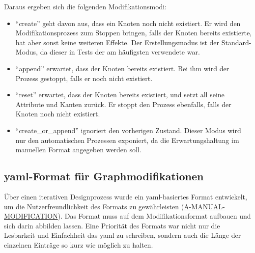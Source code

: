 Daraus ergeben sich die folgenden Modifikationsmodi:

\begin{itemize}
    \itemsep0em
    \item \enquote{create} geht davon aus, dass ein Knoten noch nicht existiert.
    Er wird den Modifikationsprozess zum Stoppen bringen, falls der Knoten bereits existierte, hat aber sonst keine weiteren Effekte.
    Der Erstellungsmodus ist der Standard-Modus, da dieser in Tests der am häufigsten verwendete war.
    \item \enquote{append} erwartet, dass der Knoten bereits existiert.
    Bei ihm wird der Prozess gestoppt, falls er noch nicht existiert.
    \item \enquote{reset} erwartet, dass der Knoten bereits existiert, und setzt all seine Attribute und Kanten zurück.
    Er stoppt den Prozess ebenfalls, falls der Knoten noch nicht existiert.
    \item \enquote{create\_or\_append} ignoriert den vorherigen Zustand.
    Dieser Modus wird nur den automatischen Prozessen exponiert, da die Erwartungshaltung im manuellen Format angegeben werden soll.
\end{itemize}

\subsection{\acrshort{yaml}-Format für Graphmodifikationen}\label{subsec:modell-graph-modification-yaml}

Über einen iterativen Designprozess wurde ein \acrshort{yaml}-basiertes Format entwickelt, um die Nutzerfreundlichkeit des Formats zu gewährleisten (\hyperref[subsec:req-manual-format-modification]{A-MANUAL-MODIFICATION}).
Das Format muss auf dem Modifikationsformat aufbauen und sich darin abbilden lassen.
Eine Priorität des Formats war nicht nur die Lesbarkeit und Einfachheit das \acrshort{yaml} zu schreiben, sondern auch die Länge der einzelnen Einträge so kurz wie möglich zu halten.

